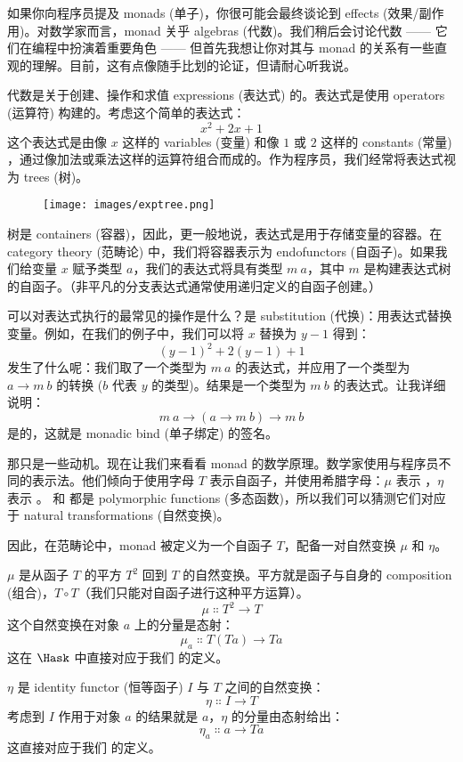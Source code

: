 
\lettrine[lhang=0.17]{如}{果你向程序员提及} monads (单子)，你很可能会最终谈论到 effects (效果/副作用)。对数学家而言，monad 关乎 algebras (代数)。我们稍后会讨论代数 —— 它们在编程中扮演着重要角色 —— 但首先我想让你对其与 monad 的关系有一些直观的理解。目前，这有点像随手比划的论证，但请耐心听我说。

代数是关于创建、操作和求值 expressions (表达式) 的。表达式是使用 operators (运算符) 构建的。考虑这个简单的表达式：
\[x^2 + 2 x + 1\]
这个表达式是由像 $x$ 这样的 variables (变量) 和像 $1$ 或 $2$ 这样的 constants (常量) ，通过像加法或乘法这样的运算符组合而成的。作为程序员，我们经常将表达式视为 trees (树)。

\begin{figure}[H]
  \centering
  \texttt{[image: images/exptree.png]}
\end{figure}

\noindent
树是 containers (容器)，因此，更一般地说，表达式是用于存储变量的容器。在 category theory (范畴论) 中，我们将容器表示为 endofunctors (自函子)。如果我们给变量 $x$ 赋予类型 $a$，我们的表达式将具有类型 $m\ a$，其中 $m$ 是构建表达式树的自函子。（非平凡的分支表达式通常使用递归定义的自函子创建。）

可以对表达式执行的最常见的操作是什么？是 substitution (代换)：用表达式替换变量。例如，在我们的例子中，我们可以将 $x$ 替换为 $y - 1$ 得到：
\[(y - 1)^2 + 2 (y - 1) + 1\]
发生了什么呢：我们取了一个类型为 $m\ a$ 的表达式，并应用了一个类型为 $a \to m\ b$ 的转换 ($b$ 代表 $y$ 的类型)。结果是一个类型为 $m\ b$ 的表达式。让我详细说明：
\[m\ a \to (a \to m\ b) \to m\ b\]
是的，这就是 monadic bind (单子绑定) 的签名。

那只是一些动机。现在让我们来看看 monad 的数学原理。数学家使用与程序员不同的表示法。他们倾向于使用字母 $T$ 表示自函子，并使用希腊字母：$\mu$ 表示 ，$\eta$ 表示 。 和  都是 polymorphic functions (多态函数)，所以我们可以猜测它们对应于 natural transformations (自然变换)。

因此，在范畴论中，monad 被定义为一个自函子 $T$，配备一对自然变换 $\mu$ 和 $\eta$。

$\mu$ 是从函子 $T$ 的平方 $T^2$ 回到 $T$ 的自然变换。平方就是函子与自身的 composition (组合)，$T \circ T$（我们只能对自函子进行这种平方运算）。
\[\mu \Colon T^2 \to T\]
这个自然变换在对象 $a$ 上的分量是态射：
\[\mu_a \Colon T (T a) \to T a\]
这在 $\Hask$ 中直接对应于我们  的定义。

$\eta$ 是 identity functor (恒等函子) $I$ 与 $T$ 之间的自然变换：
\[\eta \Colon I \to T\]
考虑到 $I$ 作用于对象 $a$ 的结果就是 $a$，$\eta$ 的分量由态射给出：
\[\eta_a \Colon a \to T a\]
这直接对应于我们  的定义。

